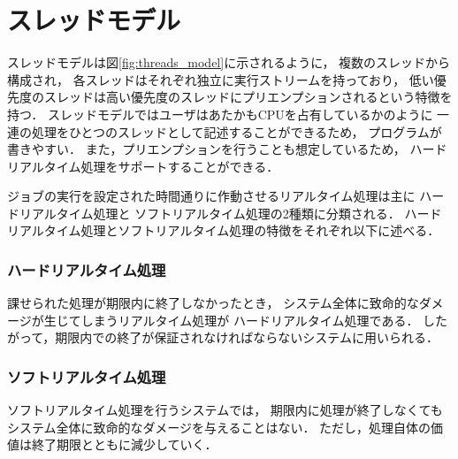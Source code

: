 \section{スレッドモデル}\label{sec:threads_model}
スレッドモデルは図\ref{fig:threads_model}に示されるように，
複数のスレッドから構成され，
各スレッドはそれぞれ独立に実行ストリームを持っており，
低い優先度のスレッドは高い優先度のスレッドにプリエンプションされるという特徴を持つ．
スレッドモデルではユーザはあたかもCPUを占有しているかのように
一連の処理をひとつのスレッドとして記述することができるため，
プログラムが書きやすい．
また，プリエンプションを行うことも想定しているため，
ハードリアルタイム処理をサポートすることができる．

ジョブの実行を設定された時間通りに作動させるリアルタイム処理は主に
ハードリアルタイム処理と
ソフトリアルタイム処理の2種類に分類される．
ハードリアルタイム処理とソフトリアルタイム処理の特徴をそれぞれ以下に述べる．


\subsubsection{ハードリアルタイム処理}

\vspace{0.5em}課せられた処理が期限内に終了しなかったとき，
システム全体に致命的なダメージが生じてしまうリアルタイム処理が
ハードリアルタイム処理である．
したがって，期限内での終了が保証されなければならないシステムに用いられる．

\subsubsection{ソフトリアルタイム処理}

\vspace{0.5em}ソフトリアルタイム処理を行うシステムでは，
期限内に処理が終了しなくてもシステム全体に致命的なダメージを与えることはない．
ただし，処理自体の価値は終了期限とともに減少していく．


